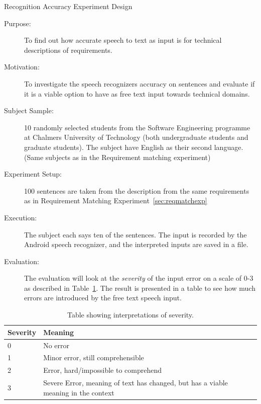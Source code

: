 \label{sec:speechrecacc}
\begin{framed}
    \begin{center}
    {\LARGE \sc Recognition Accuracy Experiment Design}
    \begin{description}
    \item [Purpose:] To find out how accurate speech to text as input is for technical descriptions of requirements.
    \item [Motivation:]
    To investigate the speech recognizers accuracy on sentences and evaluate if it is a viable option to have as free text input towards technical domains.
    \item [Subject Sample:] 10 randomly selected students from the Software Engineering programme at Chalmers University of Technology (both undergraduate students and graduate students). The subject have English as their second language. (Same subjects as in the Requirement matching experiment)
    \item [Experiment Setup:] 100 sentences are taken from the description from the same requirements as in Requirement Matching Experiment~\ref{sec:reqmatchexp} 
    \item [Execution:] The subject each says ten of the sentences. The input is recorded by the Android speech recognizer, and the interpreted inputs are saved in a file.
    \item [Evaluation:] The evaluation will look at the \emph{severity} of the input error on a scale of 0-3 as described in Table~\ref{tab:severity}. The result is presented in a table to see how much errors are introduced by the free text speech input.
    
    \end{description}
    \end{center}
\end{framed}

\begin{table}[h!]
    \centering
    \caption{Table showing interpretations of severity.}
        \begin{tabular}{ l p{8cm} }
            \hline
            Severity & Meaning \\
            \hline
            0 & No error \\
            1 & Minor error, still comprehensible \\
            2 & Error, hard/impossible to comprehend \\
            3 & Severe Error, meaning of text has changed, but has a viable meaning in the context \\
            \end{tabular}
    \label{tab:severity}
\end{table}

